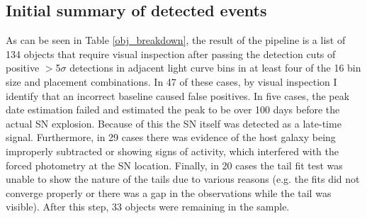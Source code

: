 \documentclass[a4paper,oneside,12pt, class=Latex/Classes/PhDthesisPSnPDF, crop=false]{standalone}
\begin{document}
\subsection{Initial summary of detected events}
\label{results_summary}
As can be seen in Table \ref{obj_breakdown}, the result of the pipeline is a list of 134 objects that require visual inspection after passing the detection cuts of positive $>$5$\sigma$ detections in adjacent light curve bins in at least four of the 16 bin size and placement combinations. In 47 of these cases, by visual inspection I identify that an incorrect baseline caused false positives. In five cases, the peak date estimation failed and estimated the peak to be over 100 days before the actual SN explosion. Because of this the SN itself was detected as a late-time signal. Furthermore, in 29 cases there was evidence of the host galaxy being improperly subtracted or showing signs of activity, which interfered with the forced photometry at the SN location. Finally, in 20 cases the tail fit test was unable to show the nature of the tails due to various reasons (e.g. the fits did not converge properly or there was a gap in the observations while the tail was visible). After this step, 33 objects were remaining in the sample.
\end{document}
